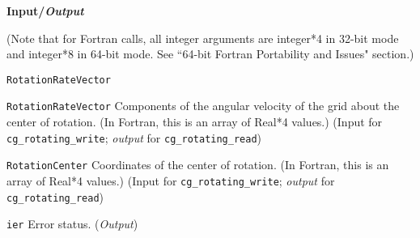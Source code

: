 \noindent
\textbf{\textcolor{input}{Input}/\textcolor{output}{\textit{Output}}}

\noindent (Note that for Fortran calls, all integer arguments are integer*4 in 32-bit mode and integer*8 in 64-bit mode.
See ``64-bit Fortran Portability and Issues" section.)

\begin{Ventryi}{\texttt{RotationRateVector}}\raggedright
\item [\texttt{RotationRateVector}]
      Components of the angular velocity of the grid about the center
      of rotation.
      (In Fortran, this is an array of Real*4 values.)
      (\textcolor{input}{Input} for \texttt{cg\_rotating\_write};
      \textcolor{output}{\textit{output}} for \texttt{cg\_rotating\_read})
\item [\texttt{RotationCenter}]
      Coordinates of the center of rotation.
      (In Fortran, this is an array of Real*4 values.)
      (\textcolor{input}{Input} for \texttt{cg\_rotating\_write};
      \textcolor{output}{\textit{output}} for \texttt{cg\_rotating\_read})
\item [\texttt{ier}]
      Error status.
      (\textcolor{output}{\textit{Output}})
\end{Ventryi}

